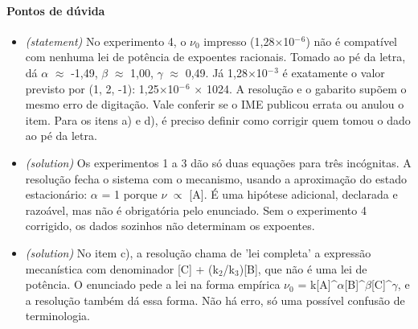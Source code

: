 \documentclass{article}%
\begin{document}
\paragraph{Pontos de dúvida}%
\begin{itemize}%
\item%
\textit{(statement)} No experimento 4, o $\nu$$_{0}$ impresso (1,28$\times$10$^{-}$$^{6}$) não é compatível com nenhuma lei de potência de expoentes racionais. Tomado ao pé da letra, dá $\alpha$ $\approx$ -1,49, $\beta$ $\approx$ 1,00, $\gamma$ $\approx$ 0,49. Já 1,28$\times$10$^{-}$$^3$ é exatamente o valor previsto por (1, 2, -1): 1,25$\times$10$^{-}$$^{6}$ $\times$ 1024. A resolução e o gabarito supõem o mesmo erro de digitação. Vale conferir se o IME publicou errata ou anulou o item. Para os itens a) e d), é preciso definir como corrigir quem tomou o dado ao pé da letra.%
\item%
\textit{(solution)} Os experimentos 1 a 3 dão só duas equações para três incógnitas. A resolução fecha o sistema com o mecanismo, usando a aproximação do estado estacionário: $\alpha$ = 1 porque $\nu$ $\propto$ {[}A{]}. É uma hipótese adicional, declarada e razoável, mas não é obrigatória pelo enunciado. Sem o experimento 4 corrigido, os dados sozinhos não determinam os expoentes.%
\item%
\textit{(solution)} No item c), a resolução chama de 'lei completa' a expressão mecanística com denominador {[}C{]} + (k$_{2}$/k$_{3}$){[}B{]}, que não é uma lei de potência. O enunciado pede a lei na forma empírica $\nu$$_{0}$ = k{[}A{]}\^{}$\alpha${[}B{]}\^{}$\beta${[}C{]}\^{}$\gamma$, e a resolução também dá essa forma. Não há erro, só uma possível confusão de terminologia.%
\end{itemize}%
\end{document}
